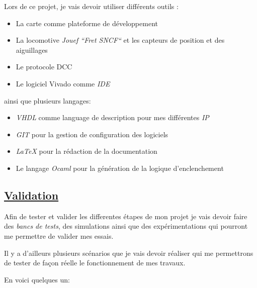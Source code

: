 Lors de ce projet, je vais devoir utiliser diff\'erents outils :
\begin{itemize}
  \item La carte \crt comme plateforme de d\'eveloppement
  \item La locomotive \emph{Jouef ``Fret SNCF``}\cite{Jouef}  et les capteurs de
    position et des aiguillages
  \item Le protocole DCC \cite{DCC}
  \item Le logiciel Vivado comme \emph{IDE}
\end{itemize}

ainsi que plusieurs langages:
\begin{itemize}
  \item \emph{VHDL}\cite{VHDL} comme language de description pour mes diff\'erentes
    \emph{IP}
  \item \emph{GIT}\cite{GIT} pour la gestion de configuration des logiciels
  \item \emph{\LaTeX}\cite{LATEX} pour la r\'edaction de la documentation
  \item Le langage \emph{Ocaml}\cite{OCAML} pour la g\'en\'eration de la logique d'enclenchement
\end{itemize}


\subsection{\underline{ Validation}}
\label{sec:valid}

Afin de tester et valider les differentes \'etapes de mon projet je vais
devoir faire des \emph{bancs de tests}, des simulations ainsi que des
exp\'erimentations qui pourront me permettre de valider mes essais.

Il y a d'ailleurs plusieurs sc\'enarios que je vais devoir r\'ealiser qui
me permettrons de tester de façon r\'eelle le fonctionnement de mes travaux.

En voici quelques un:

